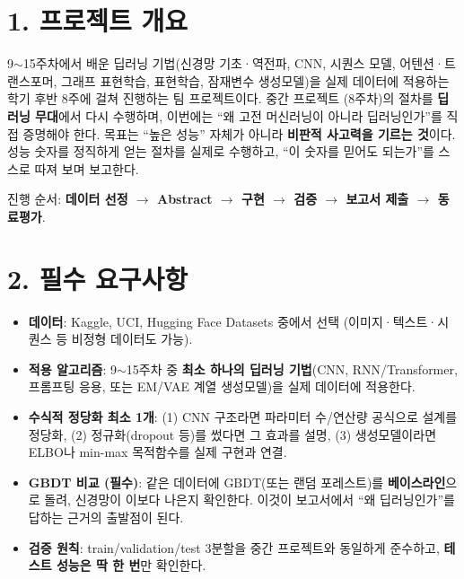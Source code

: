 \documentclass[12pt]{article}
\begin{document}

\section*{1. 프로젝트 개요}
9$\sim$15주차에서 배운 딥러닝 기법(신경망 기초·역전파, CNN,
시퀀스 모델, 어텐션·트랜스포머, 그래프 표현학습, 표현학습, 잠재변수
생성모델)을 실제 데이터에 적용하는 학기 후반 8주에 걸쳐 진행하는 팀 프로젝트이다. 중간 프로젝트
(8주차)의 절차를 \textbf{딥러닝 무대}에서 다시 수행하며, 이번에는
``왜 고전 머신러닝이 아니라 딥러닝인가''를 직접 증명해야 한다.
목표는 ``높은 성능'' 자체가 아니라 \textbf{비판적 사고력을 기르는 것}이다.
성능 숫자를 정직하게 얻는 절차를 실제로 수행하고, ``이 숫자를 믿어도
되는가''를 스스로 따져 보며 보고한다.

\vspace{4pt}
\noindent 진행 순서: \textbf{데이터 선정 $\to$ Abstract $\to$ 구현 $\to$
검증 $\to$ 보고서 제출 $\to$ 동료평가}.

\section*{2. 필수 요구사항}
\begin{itemize}
\item \textbf{데이터}: Kaggle, UCI, Hugging Face Datasets 중에서
  선택 (이미지·텍스트·시퀀스 등 비정형 데이터도 가능).
\item \textbf{적용 알고리즘}: 9$\sim$15주차 중 \textbf{최소
  하나의 딥러닝 기법}(CNN, RNN/Transformer, 프롬프팅 응용, 또는
  EM/VAE 계열 생성모델)을 실제 데이터에 적용한다.
\item \textbf{수식적 정당화 최소 1개}: (1) CNN 구조라면 파라미터
  수/연산량 공식으로 설계를 정당화, (2) 정규화(dropout 등)를
  썼다면 그 효과를 설명, (3) 생성모델이라면 ELBO나 min-max
  목적함수를 실제 구현과 연결.
\item \textbf{GBDT 비교 (필수)}: 같은 데이터에 GBDT(또는 랜덤
  포레스트)를 \textbf{베이스라인}으로 돌려, 신경망이 이보다
  나은지 확인한다. 이것이 보고서에서 ``왜 딥러닝인가''를 답하는
  근거의 출발점이 된다.
\item \textbf{검증 원칙}: train/validation/test 3분할을 중간 프로젝트와
  동일하게 준수하고, \textbf{테스트 성능은 딱 한 번}만 확인한다.
\end{itemize}

\newpage
\end{document}
